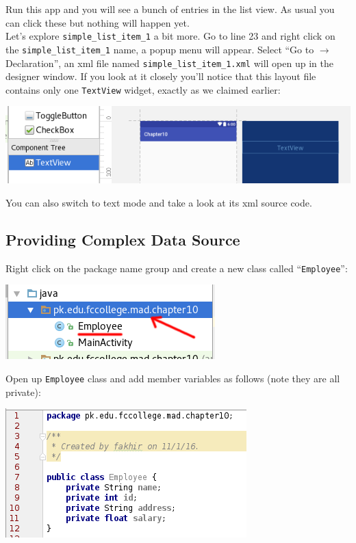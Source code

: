 Run this app and you will see a bunch of entries in the list view. As usual you can click these but nothing will happen yet. \\

Let's explore \texttt{simple\_list\_item\_1} a bit more. Go to line 23 and right click on the \texttt{simple\_list\_item\_1} name, a popup menu will appear. Select ``Go to $\rightarrow$ Declaration'', an xml file named \texttt{simple\_list\_item\_1.xml} will open up in the designer window. If you look at it closely you'll notice that this layout file contains only one \texttt{TextView} widget, exactly as we claimed earlier:

\begin{center}
	\includegraphics[scale=0.4]{chapters/ch10/images/10}
\end{center}

You can also switch to text mode and take a look at its xml source code.

\subsection{Providing Complex Data Source}
Right click on the package name group and create a new class called ``\texttt{Employee}'':

\begin{center}
	\includegraphics[scale=0.4]{chapters/ch10/images/11}
\end{center}

Open up \texttt{Employee} class and add member variables as follows (note they are all private):

\begin{center}
	\includegraphics[scale=0.4]{chapters/ch10/images/12}
\end{center}

